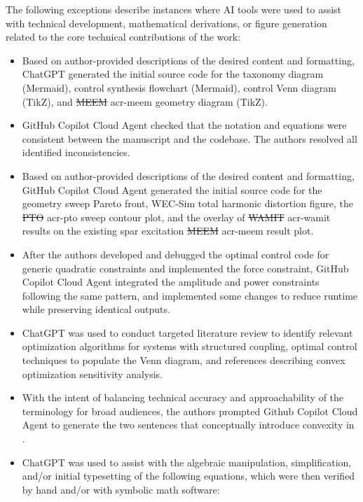 \documentclass[a4paper,fleqn,colorlinks,unicode,lineno]{cas-dc} %
\makeatletter
\providecommand{\DIFdeltex}[1]{{\protect\color{red}\sout{#1}}} %
\providecommand{\DIFaddbegin}{} %
\providecommand{\DIFaddend}{} %
\providecommand{\DIFdelbegin}{} %
\providecommand{\DIFdelend}{} %
\providecommand{\DIFdel}[1]{\texorpdfstring{\DIFdeltex{#1}}{}} %
\providecommand{\DIFscaledelfig}{0.5}
\newlength{\DIFdelgraphicswidth} %
\newlength{\DIFdelgraphicsheight} %
\providecommand{\DIFaddincludegraphics}[2][]{{\color{blue}\fbox{\DIFOincludegraphics[#1]{#2}}}} %
\providecommand{\DIFdelincludegraphics}[2][]{%
\sbox{\DIFdelgraphicsbox}{\DIFOincludegraphics[#1]{#2}}%
\settoboxwidth{\DIFdelgraphicswidth}{\DIFdelgraphicsbox} %
\settoboxtotalheight{\DIFdelgraphicsheight}{\DIFdelgraphicsbox} %
\scalebox{\DIFscaledelfig}{%
\parbox[b]{\DIFdelgraphicswidth}{\usebox{\DIFdelgraphicsbox}\\[-\baselineskip] \rule{\DIFdelgraphicswidth}{0em}}\llap{\resizebox{\DIFdelgraphicswidth}{\DIFdelgraphicsheight}{%
\setlength{\unitlength}{\DIFdelgraphicswidth}%
\begin{picture}(1,1)%
\thicklines\linethickness{2pt} %
{\color[rgb]{1,0,0}\put(0,0){\framebox(1,1){}}}%
{\color[rgb]{1,0,0}\put(0,0){\line( 1,1){1}}}%
{\color[rgb]{1,0,0}\put(0,1){\line(1,-1){1}}}%
\end{picture}%
}\hspace*{3pt}}} %
} %
\DeclareRobustCommand{\DIFaddbegin}{\DIFOaddbegin \let\includegraphics\DIFaddincludegraphics} %
\DeclareRobustCommand{\DIFaddend}{\DIFOaddend \let\includegraphics\DIFOincludegraphics} %
\DeclareRobustCommand{\DIFdelbegin}{\DIFOdelbegin \let\includegraphics\DIFdelincludegraphics} %
\DeclareRobustCommand{\DIFdelend}{\DIFOaddend \let\includegraphics\DIFOincludegraphics} %
\let\sout@orig\sout %
\renewcommand{\sout}[1]{\ifmmode\text{\sout@orig{\ensuremath{#1}}}\else\sout@orig{#1}\fi} %
\makeatother
\begin{document}
The following exceptions describe instances where AI tools were used to assist with technical development, mathematical derivations, or figure generation related to the core technical contributions of the work:
\begin{itemize}[leftmargin=*]
\item Based on author-provided descriptions of the desired content and formatting, ChatGPT generated the initial source code for the taxonomy diagram (Mermaid), control synthesis flowchart (Mermaid), control Venn diagram (TikZ), and \DIFdelbegin \DIFdel{MEEM }\DIFdelend \DIFaddbegin \gls{acr-meem} \DIFaddend geometry diagram (TikZ).
\item GitHub Copilot Cloud Agent checked that the notation and equations were consistent between the manuscript and the codebase. The authors resolved all identified inconsistencies.
\item Based on author-provided descriptions of the desired content and formatting, GitHub Copilot Cloud Agent generated the initial source code for the geometry sweep Pareto front, WEC-Sim total harmonic distortion figure, the \DIFdelbegin \DIFdel{PTO }\DIFdelend \DIFaddbegin \gls{acr-pto} \DIFaddend sweep contour plot, and the overlay of \DIFdelbegin \DIFdel{WAMIT }\DIFdelend \DIFaddbegin \gls{acr-wamit} \DIFaddend results on the existing spar excitation \DIFdelbegin \DIFdel{MEEM }\DIFdelend \DIFaddbegin \gls{acr-meem} \DIFaddend result plot.
\item After the authors developed and debugged the optimal control code for generic quadratic constraints and implemented the force constraint, GitHub Copilot Cloud Agent integrated the amplitude and power constraints following the same pattern, and implemented some changes to reduce runtime while preserving identical outputs.
\item ChatGPT was used to conduct targeted literature review to identify relevant optimization algorithms for systems with structured coupling, optimal control techniques to populate the Venn diagram, and references describing convex optimization sensitivity analysis.
\item With the intent of balancing technical accuracy and approachability of the terminology for broad audiences, the authors prompted Github Copilot Cloud Agent to generate the two sentences that conceptually introduce convexity in .
\item ChatGPT was used to assist with the algebraic manipulation, simplification, and/or initial typesetting of the following equations, which were then verified by hand and/or with symbolic math software:

\end{itemize}
\end{document}
